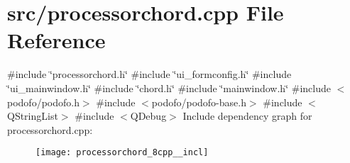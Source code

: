 \section{src/processorchord.cpp File Reference}
\label{processorchord_8cpp}
{\ttfamily \#include \char`\"{}processorchord.\+h\char`\"{}}\newline
{\ttfamily \#include \char`\"{}ui\+\_\+formconfig.\+h\char`\"{}}\newline
{\ttfamily \#include \char`\"{}ui\+\_\+mainwindow.\+h\char`\"{}}\newline
{\ttfamily \#include \char`\"{}chord.\+h\char`\"{}}\newline
{\ttfamily \#include \char`\"{}mainwindow.\+h\char`\"{}}\newline
{\ttfamily \#include $<$podofo/podofo.\+h$>$}\newline
{\ttfamily \#include $<$podofo/podofo-\/base.\+h$>$}\newline
{\ttfamily \#include $<$Q\+String\+List$>$}\newline
{\ttfamily \#include $<$Q\+Debug$>$}\newline
Include dependency graph for processorchord.\+cpp\+:\nopagebreak
\begin{figure}[H]
\begin{center}
\leavevmode
\texttt{[image: processorchord\_8cpp\_\_incl]}
\end{center}
\end{figure}
